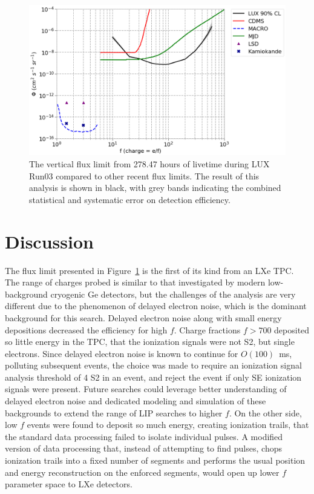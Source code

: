 \begin{figure}[htbp]
\begin{center}
\includegraphics[width=\textwidth]{figures/lips/limit.png}
\caption{The vertical flux limit from 278.47 hours of livetime during \acs{LUX} Run03 compared to other recent flux limits. The result of this analysis is shown in black, with grey bands indicating the combined statistical and systematic error on detection efficiency.}
\label{fig:limit}
\end{center}
\end{figure}

\section{Discussion}
The flux limit presented in Figure~\ref{fig:limit} is the first of its kind from an \ac{LXe} \ac{TPC}. The range of charges probed is similar to that investigated by modern low-background cryogenic Ge detectors, but the challenges of the analysis are very different due to the phenomenon of delayed electron noise, which is the dominant background for this search. Delayed electron noise along with small energy depositions decreased the efficiency for high $f$. Charge fractions $f > 700$ deposited so little energy in the \ac{TPC}, that the ionization signals were not S2, but single electrons. Since delayed electron noise is known to continue for $O(100)$~ms, polluting subsequent events, the choice was made to require an ionization signal analysis threshold of 4 S2 in an event, and reject the event if only SE ionization signals were present. Future searches could leverage better understanding of delayed electron noise and dedicated modeling and simulation of these backgrounds to extend the range of \ac{LIP} searches to higher $f$. On the other side, low $f$ events were found to deposit so much energy, creating ionization trails, that the standard data processing failed to isolate individual pulses. A modified version of data processing that, instead of attempting to find pulses, chops ionization trails into a fixed number of segments and performs the usual position and energy reconstruction on the enforced segments, would open up lower $f$ parameter space to \ac{LXe} detectors. 



